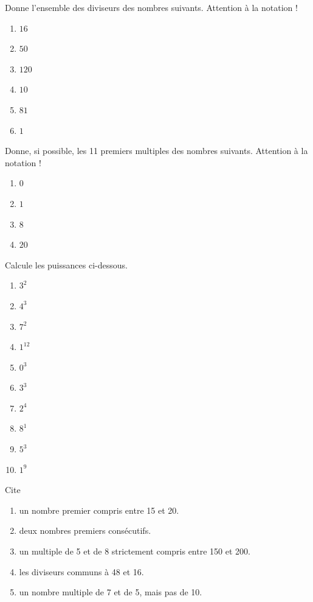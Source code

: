 \documentclass[../../syllabus_1.tex]{subfiles}
\begin{document}
\begin{exercise}
      Donne l'ensemble des diviseurs des nombres suivants. Attention à la notation !
      \begin{enumerate}[cols=3]
            \item $16$
            \item $50$
            \item $120$
            \item $10$
            \item $81$
            \item $1$
      \end{enumerate}
\end{exercise}

\begin{exercise}
      Donne, si possible, les 11 premiers multiples des nombres suivants. Attention à la notation !
      \begin{enumerate}[cols=4]
            \item $0$
            \item $1$
            \item $8$
            \item $20$
      \end{enumerate}
\end{exercise}

\begin{exercise}
      Calcule les puissances ci-dessous.
      \begin{enumerate}[cols=5]
            \item $3^2$
            \item $4^3$
            \item $7^2$
            \item $1^{12}$
            \item $0^3$
            \item $3^3$
            \item $2^4$
            \item $8^1$
            \item $5^3$
            \item $1^9$
      \end{enumerate}
\end{exercise}

\begin{exercise}
      Cite
      \begin{enumerate}
            \item un nombre premier compris entre 15 et 20.
            \item deux nombres premiers consécutifs.
            \item un multiple de 5 et de 8 strictement compris entre 150 et 200.
            \item les diviseurs communs à 48 et 16.
            \item un nombre multiple de 7 et de 5, mais pas de 10.
      \end{enumerate}
\end{exercise}
\end{document}
